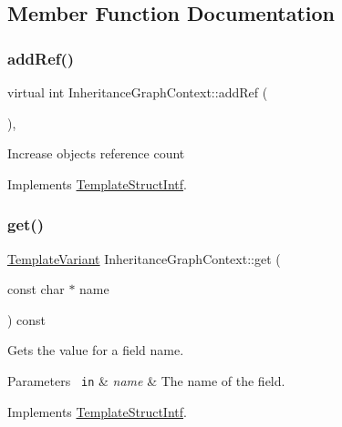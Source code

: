 \subsection{Member Function Documentation}
\mbox{\label{class_inheritance_graph_context_a015d84370ad12f94eec44da91e59c631}} 
\subsubsection{\texorpdfstring{addRef()}{addRef()}}
{\footnotesize\ttfamily virtual int Inheritance\+Graph\+Context\+::add\+Ref (\begin{DoxyParamCaption}{ }\end{DoxyParamCaption})\hspace{0.3cm}{\ttfamily [inline]}, {\ttfamily [virtual]}}

Increase object\textquotesingle{}s reference count 

Implements \mbox{\hyperlink{class_template_struct_intf_a05fe97ad47633beb326f69686faed581}{Template\+Struct\+Intf}}.

\mbox{\label{class_inheritance_graph_context_ace9c3bd9a2d01fb2f375e2796b8a8a07}} 
\subsubsection{\texorpdfstring{get()}{get()}}
{\footnotesize\ttfamily \mbox{\hyperlink{class_template_variant}{Template\+Variant}} Inheritance\+Graph\+Context\+::get (\begin{DoxyParamCaption}\item[{const char $\ast$}]{name }\end{DoxyParamCaption}) const\hspace{0.3cm}{\ttfamily [virtual]}}

Gets the value for a field name. 
\begin{DoxyParams}[1]{Parameters}
\mbox{\texttt{ in}}  & {\em name} & The name of the field. \\
\hline
\end{DoxyParams}


Implements \mbox{\hyperlink{class_template_struct_intf_a3d610cb81b4adbb531ebed3aa3d09b51}{Template\+Struct\+Intf}}.


